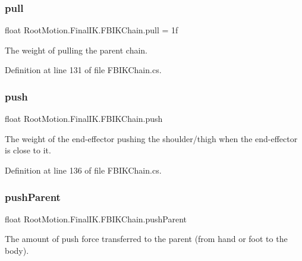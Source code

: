 \subsubsection{\texorpdfstring{pull}{pull}}
{\footnotesize\ttfamily float Root\+Motion.\+Final\+I\+K.\+F\+B\+I\+K\+Chain.\+pull = 1f}



The weight of pulling the parent chain. 



Definition at line 131 of file F\+B\+I\+K\+Chain.\+cs.

\mbox{\label{class_root_motion_1_1_final_i_k_1_1_f_b_i_k_chain_a96f80d26536e04e98dfdaca47790f700}} 
\subsubsection{\texorpdfstring{push}{push}}
{\footnotesize\ttfamily float Root\+Motion.\+Final\+I\+K.\+F\+B\+I\+K\+Chain.\+push}



The weight of the end-\/effector pushing the shoulder/thigh when the end-\/effector is close to it. 



Definition at line 136 of file F\+B\+I\+K\+Chain.\+cs.

\mbox{\label{class_root_motion_1_1_final_i_k_1_1_f_b_i_k_chain_a35344c1d18911c7eb1a38cf636fcc7dd}} 
\subsubsection{\texorpdfstring{push\+Parent}{pushParent}}
{\footnotesize\ttfamily float Root\+Motion.\+Final\+I\+K.\+F\+B\+I\+K\+Chain.\+push\+Parent}



The amount of push force transferred to the parent (from hand or foot to the body). 



